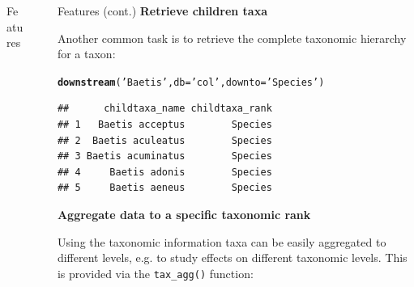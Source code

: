 \documentclass[final,t]{beamer}\usepackage[]{graphicx}\usepackage[]{color}
\makeatletter
\newcommand{\hlstr}[1]{\textcolor[rgb]{0.192,0.494,0.8}{#1}}%
\newcommand{\hlstd}[1]{\textcolor[rgb]{0.345,0.345,0.345}{#1}}%
\newcommand{\hlkwc}[1]{\textcolor[rgb]{0.333,0.667,0.333}{#1}}%
\newcommand{\hlkwd}[1]{\textcolor[rgb]{0.737,0.353,0.396}{\textbf{#1}}}%
\newenvironment{kframe}{%
 \def\at@end@of@kframe{}%
 \ifinner\ifhmode%
  \def\at@end@of@kframe{\end{minipage}}%
  \begin{minipage}{\columnwidth}%
 \fi\fi%
 \def\FrameCommand##1{\hskip\@totalleftmargin \hskip-\fboxsep
 \colorbox{shadecolor}{##1}\hskip-\fboxsep
     \hskip-\linewidth \hskip-\@totalleftmargin \hskip\columnwidth}%
 \MakeFramed {\advance\hsize-\width
   \@totalleftmargin\z@ \linewidth\hsize
   \@setminipage}}%
 {\par\unskip\endMakeFramed%
 \at@end@of@kframe}
\newenvironment{knitrout}{}{} %
\renewenvironment{knitrout}{}{\vspace{-1.8em}}
\makeatother
\begin{document}
\begin{frame}[fragile]
\begin{columns}[t]
\begin{column}{.49\linewidth}
\begin{block}{Features}
\begin{knitrout}
\end{knitrout}
\vspace{2em}

			\end{block}
		\end{column}
    
		\begin{column}{0.005\linewidth}
		\end{column}



		\begin{column}{.49\linewidth}
			\vspace{-\baselineskip}
      
      \begin{block}{Features (cont.)}
\textcolor{i6bluedark}{\textbf{\large Retrieve children taxa}}
        \vspace{0.5em}
        \par
        \begingroup
        \leftskip=2cm
        \noindent 
          Another common task is to retrieve the complete taxonomic hierarchy for a taxon:
        \par
        \endgroup
\begin{knitrout}\footnotesize
{}\color{fgcolor}\begin{kframe}
\begin{alltt}
\hlkwd{downstream}\hlstd{(}\hlstr{'Baetis'}\hlstd{,} \hlkwc{db} \hlstd{=} \hlstr{'col'}\hlstd{,} \hlkwc{downto} \hlstd{=} \hlstr{'Species'}\hlstd{)}
\end{alltt}
\end{kframe}
\end{knitrout}
\begin{knitrout}\footnotesize
{}\color{fgcolor}\begin{kframe}
\begin{verbatim}
##      childtaxa_name childtaxa_rank
## 1   Baetis acceptus        Species
## 2  Baetis aculeatus        Species
## 3 Baetis acuminatus        Species
## 4     Baetis adonis        Species
## 5     Baetis aeneus        Species
\end{verbatim}
\end{kframe}
\end{knitrout}
\vspace{2em}

\textcolor{i6bluedark}{\textbf{\large Aggregate data to a specific taxonomic rank}}
        \vspace{0.5em}
        \par
        \begingroup
        \leftskip=2cm
        \noindent 
          Using the taxonomic information taxa can be easily aggregated to different levels, e.g. to study effects on different taxonomic levels.
          This is provided via the \texttt{tax\_agg()} function:
        \par
        \endgroup


\end{block}
\end{column}
\end{columns}
\end{frame}
\end{document}
